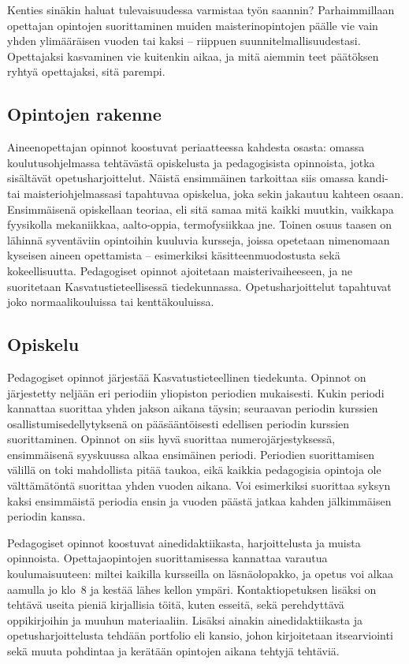 \documentclass[../ala_hataile.tex]{subfiles}
\begin{document}
Kenties sinäkin
haluat tulevaisuudessa varmistaa työn
saannin? Parhaimmillaan opettajan opintojen
suorittaminen muiden maisterin\-opintojen
päälle vie vain yhden ylimääräisen vuoden
tai kaksi -- riippuen suunnitelmallisuudestasi. Opettajaksi kasvaminen vie kuitenkin aikaa, ja mitä aiemmin teet päätöksen ryhtyä opettajaksi, sitä parempi.
\subsection*{Opintojen rakenne}
Aineenopettajan opinnot koostuvat
periaatteessa kahdesta osasta: omassa koulutus\-ohjelmassa
tehtävästä opiskelusta ja pedagogisista
opinnoista, jotka sisältävät opetus\-harjoittelut. Näistä
ensimmäinen tarkoittaa siis omassa kandi- tai maisteri\-ohjelmassasi
tapahtuvaa opiskelua, joka sekin jakautuu
kahteen osaan. Ensimmäisenä opiskellaan
teoriaa, eli sitä samaa mitä kaikki
muutkin, vaikkapa fyysikolla mekaniikkaa,
aalto-oppia, termo\-fysiikkaa jne. Toinen
osuus taasen on lähinnä syventäviin opintoihin
kuuluvia kursseja, joissa opetetaan nimenomaan kyseisen aineen opettamista -- esimerkiksi käsitteen\-muodostusta sekä
kokeellisuutta. Pedagogiset opinnot ajoitetaan maisteri\-vaiheeseen, ja ne
suoritetaan Kasvatus\-tieteellisessä tiedekunnassa. Opetus\-harjoittelut tapahtuvat joko normaali\-kouluissa tai kenttä\-kouluissa.
\subsection*{Opiskelu}
Pedagogiset opinnot järjestää Kasvatus\-tieteellinen tiedekunta. Opinnot on järjestetty neljään eri periodiin yliopiston
periodien mukaisesti. Kukin periodi kannattaa
suorittaa yhden jakson aikana täysin;
seuraavan periodin kurssien osallistumis\-edellytyksenä
on pää\-sääntöisesti edellisen
periodin kurssien suorittaminen. Opinnot
on siis hyvä suorittaa numero\-järjestyksessä,
ensimmäisenä syys\-kuussa alkaa ensimäinen periodi. Periodien suorittamisen välillä on toki
mahdollista pitää taukoa, eikä kaikkia pedagogisia
opintoja ole välttämätöntä suorittaa
yhden vuoden aikana. Voi esimerkiksi suorittaa syksyn kaksi ensimmäistä periodia ensin ja vuoden päästä jatkaa kahden jälkimmäisen periodin kanssa.

Pedagogiset opinnot koostuvat aine\-didaktiikasta,
harjoittelusta ja muista opinnoista.
Opettajaopintojen suorittamisessa
kannattaa varautua koulumaisuuteen: miltei
kaikilla kursseilla on läsnä\-olo\-pakko, ja
opetus voi alkaa aamulla jo klo~8 ja kestää
lähes kellon ympäri. Kontakti\-opetuksen
lisäksi on tehtävä useita pieniä kirjallisia
töitä, kuten esseitä, sekä perehdyttävä oppi\-kirjoihin
ja muuhun materiaaliin. Lisäksi
ainakin aine\-didaktiikasta ja opetus\-harjoittelusta
tehdään port\-folio eli kansio, johon
kirjoitetaan itsearviointi sekä muuta pohdintaa
ja kerätään opintojen aikana tehtyjä
tehtäviä.
 
\end{document}
